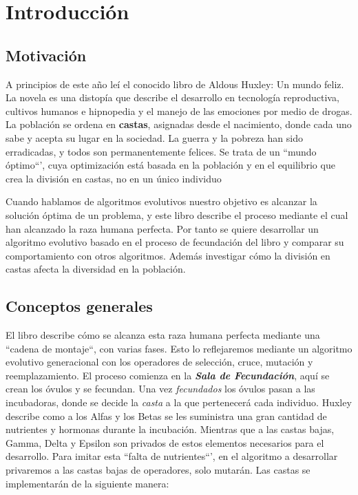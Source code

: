 \chapter{Introducción}

\section{Motivación}

A principios de este año leí el conocido libro de Aldous Huxley: Un mundo feliz. La novela es una
distopía que describe el desarrollo en tecnología reproductiva, cultivos humanos e hipnopedia y el manejo de las
emociones por medio de drogas. La población se ordena en \textbf{castas}, asignadas desde el nacimiento, donde cada uno
sabe y acepta su lugar en la sociedad. La guerra y la pobreza han sido erradicadas, y todos son permanentemente
felices. Se trata de un ``mundo óptimo``', cuya optimización está basada en la población y en el equilibrio que crea
la división en castas, no en un único individuo 

Cuando hablamos de algoritmos evolutivos nuestro objetivo es alcanzar la solución óptima de un problema, y este libro describe el 
proceso mediante el cual han alcanzado la raza humana perfecta. Por tanto se quiere desarrollar un algoritmo evolutivo basado en 
el proceso de fecundación del libro y comparar su comportamiento con otros algoritmos. Además investigar cómo la división en castas afecta 
la diversidad en la población.

\section{Conceptos generales}

El libro describe cómo se alcanza esta raza humana perfecta mediante una ``cadena de montaje``, con varias fases. Esto lo reflejaremos mediante 
un algoritmo evolutivo generacional con los operadores de selección, cruce, mutación y reemplazamiento. El proceso comienza en la \textbf{\textit{Sala de Fecundación}}, 
aquí se crean los óvulos y se fecundan. Una vez \textit{fecundados} los óvulos pasan a las incubadoras, donde se decide la \textit{casta} a la que pertenecerá cada individuo. Huxley
describe como a los Alfas y los Betas se les suministra una gran cantidad de nutrientes y hormonas durante la incubación. Mientras que a las castas bajas, Gamma, Delta y
Epsilon son privados de estos elementos necesarios para el desarrollo. Para imitar esta ``falta de nutrientes``', en el algoritmo a desarrollar privaremos a las castas bajas de
operadores, solo mutarán. Las castas se implementarán de la siguiente manera: 

